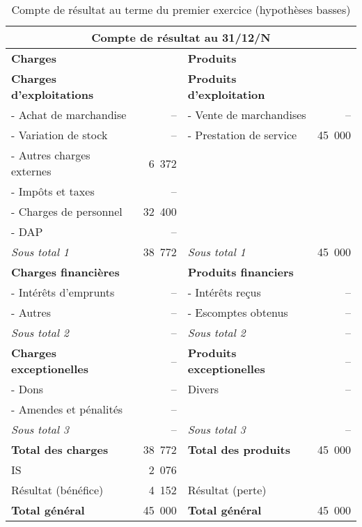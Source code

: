 		\newpage
		\vfill
		\begin{table}[h]
		  \centering
		  \begin{tabular}{|l|r|l|r|}
			\hline
			\multicolumn{4}{|c|}{\bf Compte de r\'esultat au 31/12/N}\\
			\hline
			{\bf Charges} & & {\bf Produits} & \\
			\hline
			{\bf Charges d'exploitations} & & {\bf Produits d'exploitation} & \\
			- Achat de marchandise & -- & - Vente de marchandises & --\\
			- Variation de stock & -- & - Prestation de service & 45~000\\
			- Autres charges externes & 6~372 & & \\
			- Impôts et taxes & -- & & \\
			- Charges de personnel & 32~400 & & \\
			- DAP & -- & & \\
			\cline{2-2}\cline{4-4}
			{\it Sous total 1} & 38~772 & {\it Sous total 1} & 45~000\\
			\cline{2-2}\cline{4-4}
			{\bf Charges financi\`eres} & & {\bf Produits financiers} & \\
			- Int\'er\^ets d'emprunts & -- & - Int\'er\^ets re\c cus & --\\
			- Autres & -- & - Escomptes obtenus & -- \\
			\cline{2-2}\cline{4-4}
			{\it Sous total 2} & -- & {\it Sous total 2} & -- \\
			\cline{2-2}\cline{4-4}
			{\bf Charges exceptionelles} & -- & {\bf Produits exceptionelles} & --\\
			- Dons & -- & Divers & --\\
			- Amendes et p\'enalit\'es & -- & & \\
			\cline{2-2}\cline{4-4}
			{\it Sous total 3} & -- & {\it Sous total 3} & -- \\
			\cline{2-2}\cline{4-4}
			{\bf Total des charges} & 38~772 & {\bf Total des produits} & 45~000 \\
			\cline{2-2}\cline{4-4}
			IS & 2~076 & & \\
			R\'esultat (b\'en\'efice) & 4~152 & R\'esultat (perte) & \\
			\cline{2-2}\cline{4-4}
			{\bf Total g\'en\'eral} & 45~000 & {\bf Total g\'en\'eral} & 45~000\\
			\hline
		  \end{tabular}
		  \caption{Compte de r\'esultat au terme du premier exercice (hypoth\`eses basses)}
		  \label{tab:hypBN}
		\end{table}

